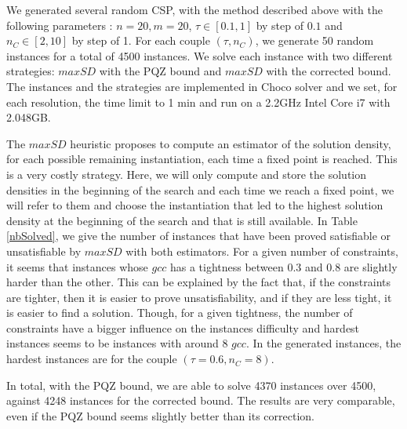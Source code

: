 \documentclass[jair,twoside,11pt,theapa]{article}
\newcommand{\noteGilles}[1]  {{\color{red}{\sc \scriptsize [Gilles: #1]}}}
\begin{document}
We generated several random CSP, with the method described above with the following parameters : $n=20, m=20$, $\tau \in [0.1,1]$ by step of $0.1$ and $n_C \in [2,10]$ by step of 1. For each couple $(\tau, n_C)$, we generate 50 random instances for a total of 4500 instances. We solve each instance with two different strategies: $maxSD$ with the PQZ bound and $maxSD$ with the corrected bound. The instances and the strategies are implemented in Choco solver \cite{chocoSolver} and we set, for each resolution, the time limit to 1 min and run on a 2.2GHz Intel Core i7 with 2.048GB.

The $maxSD$ heuristic proposes to compute an estimator of the solution density, for each possible remaining instantiation, each time a fixed point is reached. This is a very costly strategy. Here, we will only compute and store the solution densities in the beginning of the search and each time we reach a fixed point, we will refer to them and choose the instantiation that led to the highest solution density at the beginning of the search and that is still available.
\noteGilles{Puisque tous les domaines sont initialement complets, les densités calculées à la racine ne fournissent probablement pas d'information discriminante. D'autres heuristiques de branchement font sans doute tout aussi bien dans de telles circonstances?
Il faudrait au moins retirer des valeurs des domaines initiaux.}
\noteGilles{Pour l'efficacité, ce que nous avons proposé dans notre article à CPAIOR'18 est de recalculer seulement lorsque les domaines des variables dans la portée d'une contrainte ont suffisamment changé, mesuré simplement comme la somme de la taille des domaines.}
In Table \ref{nbSolved}, we give the number of instances that have been proved satisfiable or unsatisfiable by $maxSD$ with both estimators. For a given number of constraints, it seems that instances whose $gcc$ has a tightness between 0.3 and 0.8 are slightly harder than the other. This can be explained by the fact that, if the constraints are tighter, then it is easier to prove unsatisfiability, and if they are less tight, it is easier to find a solution. Though, for a given tightness, the number of constraints have a bigger influence on the instances difficulty and hardest instances seems to be instances with around 8 $gcc$. In the generated instances, the hardest instances are for the couple $(\tau = 0.6, n_C = 8)$.

In total, with the PQZ bound, we are able to solve 4370 instances over 4500, against 4248 instances for the corrected bound. The results are very comparable, even if the PQZ bound seems slightly better than its correction.
\end{document}
